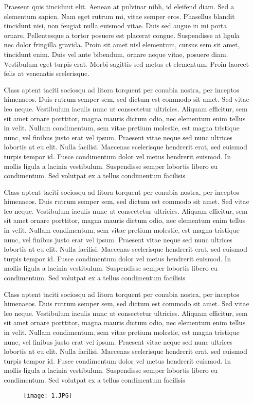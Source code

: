 \ttl
{}
Praesent quis tincidunt elit. Aenean at pulvinar nibh, id eleifend diam. Sed a elementum sapien. Nam eget rutrum mi, vitae semper eros. Phasellus blandit tincidunt nisi, non feugiat nulla euismod vitae. Duis sed augue in mi porta ornare. Pellentesque a tortor posuere est placerat congue. Suspendisse at ligula nec dolor fringilla gravida. Proin sit amet nisl elementum, cursus sem sit amet, tincidunt enim. Duis vel ante bibendum, ornare neque vitae, posuere diam. Vestibulum eget turpis erat. Morbi sagittis sed metus et elementum. Proin laoreet felis at venenatis scelerisque.

Class aptent taciti sociosqu ad litora torquent per conubia nostra, per inceptos himenaeos. Duis rutrum semper sem, sed dictum est commodo sit amet. Sed vitae leo neque. Vestibulum iaculis nunc ut consectetur ultricies. Aliquam efficitur, sem sit amet ornare porttitor, magna mauris dictum odio, nec elementum enim tellus in velit. Nullam condimentum, sem vitae pretium molestie, est magna tristique nunc, vel finibus justo erat vel ipsum. Praesent vitae neque sed nunc ultrices lobortis at eu elit. Nulla facilisi. Maecenas scelerisque hendrerit erat, sed euismod turpis tempor id. Fusce condimentum dolor vel metus hendrerit euismod. In mollis ligula a lacinia vestibulum. Suspendisse semper lobortis libero eu condimentum. Sed volutpat ex a tellus condimentum facilisis

Class aptent taciti sociosqu ad litora torquent per conubia nostra, per inceptos himenaeos. Duis rutrum semper sem, sed dictum est commodo sit amet. Sed vitae leo neque. Vestibulum iaculis nunc ut consectetur ultricies. Aliquam efficitur, sem sit amet ornare porttitor, magna mauris dictum odio, nec elementum enim tellus in velit. Nullam condimentum, sem vitae pretium molestie, est magna tristique nunc, vel finibus justo erat vel ipsum. Praesent vitae neque sed nunc ultrices lobortis at eu elit. Nulla facilisi. Maecenas scelerisque hendrerit erat, sed euismod turpis tempor id. Fusce condimentum dolor vel metus hendrerit euismod. In mollis ligula a lacinia vestibulum. Suspendisse semper lobortis libero eu condimentum. Sed volutpat ex a tellus condimentum facilisis

Class aptent taciti sociosqu ad litora torquent per conubia nostra, per inceptos himenaeos. Duis rutrum semper sem, sed dictum est commodo sit amet. Sed vitae leo neque. Vestibulum iaculis nunc ut consectetur ultricies. Aliquam efficitur, sem sit amet ornare porttitor, magna mauris dictum odio, nec elementum enim tellus in velit. Nullam condimentum, sem vitae pretium molestie, est magna tristique nunc, vel finibus justo erat vel ipsum. Praesent vitae neque sed nunc ultrices lobortis at eu elit. Nulla facilisi. Maecenas scelerisque hendrerit erat, sed euismod turpis tempor id. Fusce condimentum dolor vel metus hendrerit euismod. In mollis ligula a lacinia vestibulum. Suspendisse semper lobortis libero eu condimentum. Sed volutpat ex a tellus condimentum facilisis

\begin{figure}[ht!]
	\texttt{[image: 1.JPG]} 
\end{figure}
